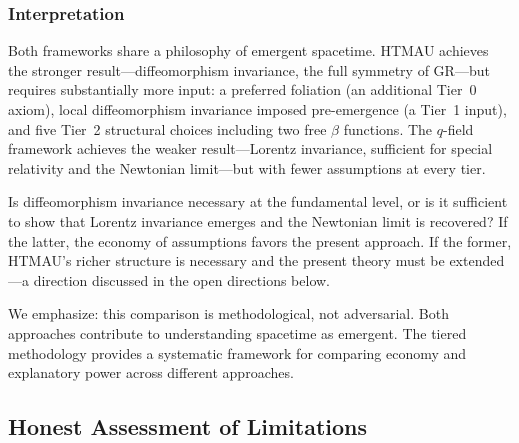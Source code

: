 \documentclass[aps,prd,twocolumn,showpacs,superscriptaddress,preprintnumbers]{revtex4-2}
\begin{document}
\subsubsection{Interpretation}

Both frameworks share a philosophy of emergent spacetime.
HTMAU achieves the stronger result---diffeomorphism invariance, the full symmetry of GR---but requires substantially more input: a preferred foliation (an additional Tier~0 axiom), local diffeomorphism invariance imposed pre-emergence (a Tier~1 input), and five Tier~2 structural choices including two free $\beta$ functions.
The $q$-field framework achieves the weaker result---Lorentz invariance, sufficient for special relativity and the Newtonian limit---but with fewer assumptions at every tier.

Is diffeomorphism invariance necessary at the fundamental level, or is it sufficient to show that Lorentz invariance emerges and the Newtonian limit is recovered?
If the latter, the economy of assumptions favors the present approach.
If the former, HTMAU's richer structure is necessary and the present theory must be extended---a direction discussed in the open directions below.

We emphasize: this comparison is methodological, not adversarial.
Both approaches contribute to understanding spacetime as emergent.
The tiered methodology provides a systematic framework for comparing economy and explanatory power across different approaches.

\subsection{Honest Assessment of Limitations}
\end{document}
